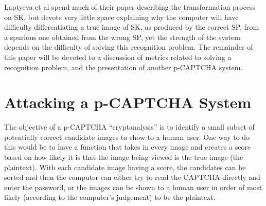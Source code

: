 \documentclass[12pt]{article}
\begin{document}
	Laptyeva et al spend much of their paper describing the transformation process on SK, but devote very little space explaining why the computer will have difficulty differentiating a true image of SK, as produced by the correct SP, from a spurious one obtained from the wrong SP, yet the strength of the system depends on the difficulty of solving this recognition problem. The remainder of this paper will be devoted to a discussion of metrics related to solving a recognition problem, and the presentation of another p-CAPTCHA system.

\section*{Attacking a p-CAPTCHA System}
	The objective of a p-CAPTCHA “cryptanalysis” is to identify a small subset of potentially correct candidate images to show to a human user. One way to do this would be to have a function that takes in every image and creates a score based on how likely it is that the image being viewed is the true image (the plaintext). With each candidate image having a score, the candidates can be sorted and then the computer can either try to read the CAPTCHA directly and enter the password, or the images can be shown to a human user in order of most likely (according to the computer's judgement) to be the plaintext.
\end{document}
